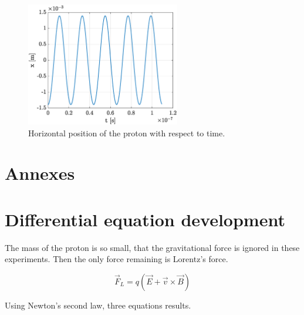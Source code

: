 \documentclass[a4paper,12pt,twoside]{article}
\begin{document}
\begin{figure}
\centering
	\includegraphics[width=0.6\textwidth]{graphs/app2_x.eps}
	\caption{Horizontal position of the proton with respect to time.}
	\label{fig:app2-position}
\end{figure}




\appendix
\section*{Annexes}

\section{Differential equation development} \label{ann:dev-eq-diff}
The mass of the proton is so small, that the gravitational force is ignored in these experiments.
Then the only force remaining is Lorentz's force.

\begin{equation*}
	\vec{F}_L = q(\vec{E} + \vec{v}\times\vec{B})
	\label{eq:lorentz-force}
\end{equation*}

Using Newton's second law, three equations results.
\end{document}
